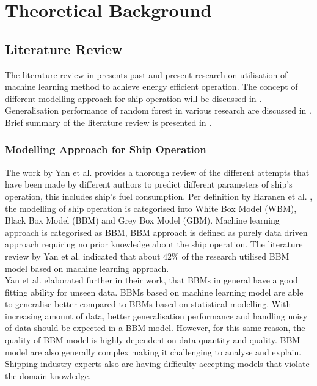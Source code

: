 \chapter{Theoretical Background}\label{chp:theory}

\section{Literature Review}\label{sec:litreview}

The literature review in  presents past and present research on utilisation of machine learning method to achieve energy efficient operation. The concept of different modelling approach for ship operation will be discussed in . Generalisation performance of random forest in various research are discussed in . Brief summary of the literature review is presented in .\\

\subsection{Modelling Approach for Ship Operation}\label{sec:ship_modelling}

The work by Yan et al. \citep{Yan.2021} provides a thorough review of the different attempts that have been made by different authors to predict different parameters of ship's operation, this includes ship's fuel consumption. Per definition by Haranen et al. \citep{MichaelHaranen.2016}, the modelling of ship operation is categorised into White Box Model (WBM), Black Box Model (BBM) and Grey Box Model (GBM). Machine learning approach is categorised as BBM, BBM approach is defined as purely data driven approach requiring no prior knowledge about the ship operation. The literature review by Yan et al. \citep{Yan.2021} indicated that about $42\%$ of the research utilised BBM model based on machine learning approach.\\ 

Yan et al. \citep{Yan.2021} elaborated further in their work, that BBMs in general have a good fitting ability for unseen data. BBMs based on machine learning model are able to generalise better compared to BBMs based on statistical modelling. With increasing amount of data, better generalisation performance and handling noisy of data should be expected in a BBM model. However, for this same reason, the quality of BBM model is highly dependent on data quantity and quality. BBM model are also generally complex making it challenging to analyse and explain. Shipping industry experts also are having difficulty accepting models that violate the domain knowledge.\\   

